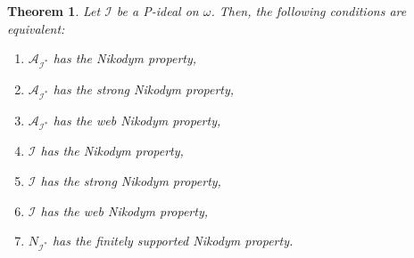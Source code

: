 \documentclass[a4paper,11pt,fleqn]{amsart}
\newtheorem{theorem}{Theorem}[section]
\theoremstyle{definition}
\theoremstyle{remark}
\numberwithin{equation}{section}
\newcommand{\aA}{\mathcal{A}}
\newcommand{\iI}{\mathcal{I}}
\begin{document}
\begin{theorem}\label{thm:p_ideal_nik_equivalences}
    Let $\iI$ be a P-ideal on $\omega$. Then, the following conditions are equivalent:
    \begin{enumerate}
        \item $\aA_{\iI^*}$ has the Nikodym property,
        \item $\aA_{\iI^*}$ has the strong Nikodym property,
        \item $\aA_{\iI^*}$ has the web Nikodym property,
        \item $\iI$ has the Nikodym property,
        \item $\iI$ has the strong Nikodym property,
        \item $\iI$ has the web Nikodym property,
        \item $N_{\iI^*}$ has the finitely supported Nikodym property.
    \end{enumerate}
\end{theorem}
\end{document}
